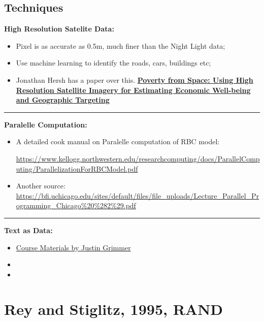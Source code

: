 \documentclass{book}
\theoremstyle{plain}
\theoremstyle{definition}
\newcommand{\myline}{\vspace{3mm} \hrule \vspace{4mm}}
\begin{document}
\subsection{Techniques} %
\label{sub:techniques}


\noindent
\textbf{High Resolution Satelite Data:}
\begin{itemize}
	\item Pixel is as accurate as 0.5m, much finer than the Night Light data;
	\item Use machine learning to identify the roads, cars, buildings etc;
	\item Jonathan Hersh has a paper over this. \textbf{\href{https://www.dropbox.com/s/zeph7rrch2rwfwp/PovSpace_JMP_Oct31.pdf?dl=0}{Poverty from Space: Using High Resolution Satellite Imagery for Estimating Economic Well-being and Geographic Targeting}}
\end{itemize}


\myline

\noindent
\textbf{Paralelle Computation:}
\begin{itemize}
	\item A detailed cook manual on Paralelle computation of RBC model: 

	\url{https://www.kellogg.northwestern.edu/researchcomputing/docs/ParallelComputing/ParallelizationForRBCModel.pdf}

	\item Another source: \url{https://bfi.uchicago.edu/sites/default/files/file_uploads/Lecture_Parallel_Programming_Chicago%20%282%29.pdf}
\end{itemize}

\myline

\noindent
\textbf{Text as Data:}
\begin{itemize}
	\item \href{run:resources/text_as_data}{Course Materials by Justin Grimmer}
	\item {}
	\item {}
\end{itemize}





\section{Rey and Stiglitz, 1995, RAND} %
\label{sec:rey_and_stiglitz_1995_rand}
\end{document}
